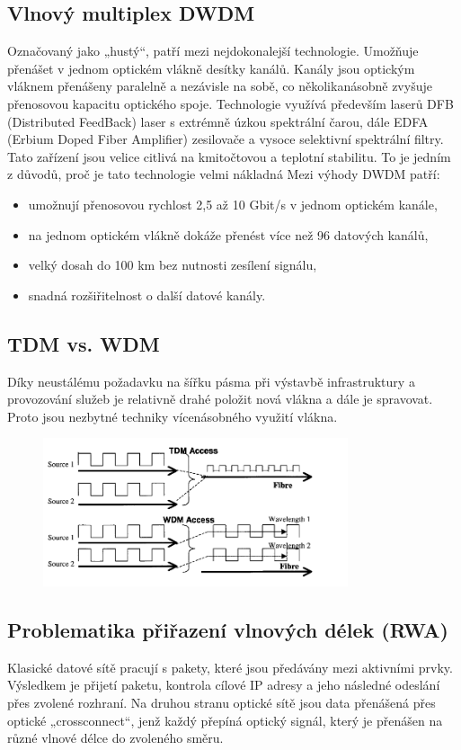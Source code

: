 \subsection{Vlnový multiplex DWDM}
Označovaný jako „hustý“, patří mezi nejdokonalejší technologie. Umožňuje přenášet v jednom optickém vlákně desítky kanálů. Kanály jsou optickým vláknem přenášeny paralelně a nezávisle na sobě, co několikanásobně zvyšuje přenosovou kapacitu optického spoje. Technologie využívá především laserů DFB (Distributed FeedBack) laser s extrémně úzkou spektrální čarou, dále EDFA (Erbium Doped Fiber Amplifier) zesilovače a vysoce selektivní
spektrální filtry. Tato zařízení jsou velice citlivá na kmitočtovou a teplotní stabilitu. To je jedním z důvodů, proč je tato technologie velmi nákladná
Mezi výhody DWDM patří: 
\begin{itemize}
    \item umožnují přenosovou rychlost 2,5 až 10 Gbit/s v jednom optickém kanále,
    \item na jednom optickém vlákně dokáže přenést více než 96 datových kanálů,
    \item velký dosah do 100 km bez nutnosti zesílení signálu,
    \item snadná rozšiřitelnost o další datové kanály.
\end{itemize}

\subsection{TDM vs. WDM}
Díky neustálému požadavku na šířku pásma při výstavbě infrastruktury a provozování služeb je relativně drahé položit nová vlákna a dále je
spravovat. Proto jsou nezbytné techniky vícenásobného využití vlákna.
\begin{figure} [h]
    \centering
    \includegraphics[width=0.8\textwidth]{snimky/TDMvsWDM.png}
    \label{fig:uml}
\end{figure}

\subsection{Problematika přiřazení vlnových délek (RWA)}
Klasické datové sítě pracují s pakety, které jsou předávány mezi aktivními prvky. Výsledkem je přijetí paketu, kontrola cílové IP adresy a jeho následné odeslání přes zvolené rozhraní. Na druhou stranu optické sítě jsou data přenášená přes optické „crossconnect“, jenž každý přepíná optický signál, který je přenášen na různé vlnové délce do zvoleného směru.

